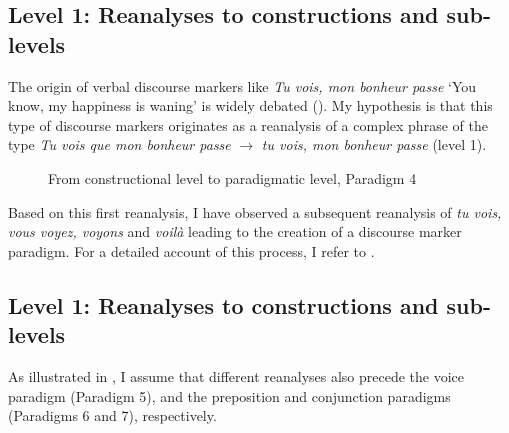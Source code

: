 \documentclass[output=paper]{langsci/langscibook}
\begin{document}
\subsection{Level 1: Reanalyses to constructions and sub-levels} \label{kragh:4.2}

The origin of verbal discourse markers like \textit{Tu vois, mon bonheur passe} ‘You know, my happiness is waning’ is widely debated (\citealt{KraghToAppear}). My hypothesis is that this type of discourse markers originates as a reanalysis of a complex phrase of the type \textit{Tu vois que mon bonheur passe} ${\rightarrow}$ \textit{tu vois, mon bonheur passe} (level 1).

 \begin{figure}
 \caption{From constructional level to paradigmatic level, Paradigm 4}
 \label{fig:kragh:6}

\end{figure}

Based on this first reanalysis, I have observed a subsequent reanalysis of \textit{tu vois, vous voyez, voyons} and \textit{voilà} leading to the creation of a discourse marker paradigm. For a detailed account of this process, I refer to \citet{KraghToAppear,KraghToAppearb}.

\subsection{Level 1: Reanalyses to constructions and sub-levels} \label{kragh:4.3}

As illustrated in , I assume that different reanalyses also precede the voice paradigm (Paradigm 5), and the preposition and conjunction paradigms (Paradigms 6 and 7), respectively.  
\end{document}
